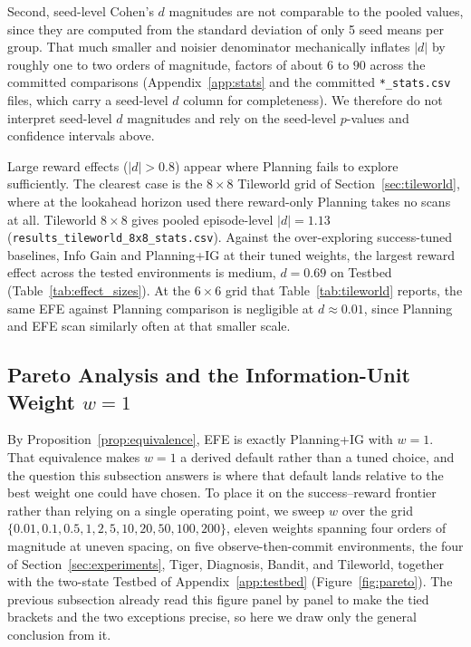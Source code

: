 Second, seed-level Cohen's $d$ magnitudes are not comparable to the pooled values, since they are computed from the standard deviation of only 5 seed means per group. That much smaller and noisier denominator mechanically inflates $|d|$ by roughly one to two orders of magnitude, factors of about $6$ to $90$ across the committed comparisons (Appendix~\ref{app:stats} and the committed \texttt{*\_\allowbreak stats.csv} files, which carry a seed-level $d$ column for completeness). We therefore do not interpret seed-level $d$ magnitudes and rely on the seed-level $p$-values and confidence intervals above.

Large reward effects ($|d| > 0.8$) appear where Planning fails to explore sufficiently. The clearest case is the $8{\times}8$ Tileworld grid of Section~\ref{sec:tileworld}, where at the lookahead horizon used there reward-only Planning takes no scans at all. Tileworld $8{\times}8$ gives pooled episode-level $|d| = 1.13$ (\texttt{results\_\allowbreak tileworld\_\allowbreak 8x8\_\allowbreak stats.csv}). Against the over-exploring success-tuned baselines, Info Gain and Planning+IG at their tuned weights, the largest reward effect across the tested environments is medium, $d{=}0.69$ on Testbed (Table~\ref{tab:effect_sizes}). At the $6{\times}6$ grid that Table~\ref{tab:tileworld} reports, the same EFE against Planning comparison is negligible at $d \approx 0.01$, since Planning and EFE scan similarly often at that smaller scale.

\subsection{Pareto Analysis and the Information-Unit Weight $w{=}1$}
\label{sec:pareto}

By Proposition~\ref{prop:equivalence}, EFE is exactly Planning+IG with $w{=}1$. That equivalence makes $w{=}1$ a derived default rather than a tuned choice, and the question this subsection answers is where that default lands relative to the best weight one could have chosen. To place it on the success--reward frontier rather than relying on a single operating point, we sweep $w$ over the grid $\{0.01, 0.1, 0.5, 1, 2, 5, 10, 20, 50, 100, 200\}$, eleven weights spanning four orders of magnitude at uneven spacing, on five observe-then-commit environments, the four of Section~\ref{sec:experiments}, Tiger, Diagnosis, Bandit, and Tileworld, together with the two-state Testbed of Appendix~\ref{app:testbed} (Figure~\ref{fig:pareto}). The previous subsection already read this figure panel by panel to make the tied brackets and the two exceptions precise, so here we draw only the general conclusion from it.

